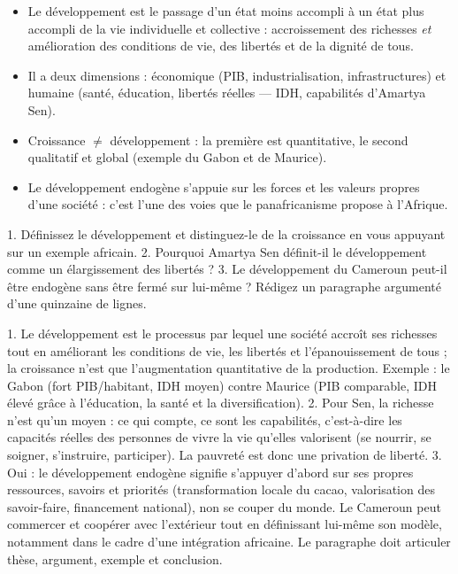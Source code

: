 \documentclass[11pt]{article}
\newcommand{\cle}[1]{{\popxbold\color{popdark}#1}}
\begin{document}
\begin{aretenir}
\begin{itemize}
\item Le \cle{développement} est le passage d'un état moins accompli à un état plus accompli de la vie individuelle et collective : accroissement des richesses \emph{et} amélioration des conditions de vie, des libertés et de la dignité de tous.
\item Il a deux dimensions : économique (PIB, industrialisation, infrastructures) et humaine (santé, éducation, libertés réelles — IDH, capabilités d'Amartya Sen).
\item \cle{Croissance} $\neq$ \cle{développement} : la première est quantitative, le second qualitatif et global (exemple du Gabon et de Maurice).
\item Le \cle{développement endogène} s'appuie sur les forces et les valeurs propres d'une société : c'est l'une des voies que le panafricanisme propose à l'Afrique.
\end{itemize}
\end{aretenir}

\begin{exercice}
1. Définissez le développement et distinguez-le de la croissance en vous appuyant sur un exemple africain. 2. Pourquoi Amartya Sen définit-il le développement comme un élargissement des libertés ? 3. Le développement du Cameroun peut-il être endogène sans être fermé sur lui-même ? Rédigez un paragraphe argumenté d'une quinzaine de lignes.
\end{exercice}

\begin{corrige}[Exercice 1]
1. Le développement est le processus par lequel une société accroît ses richesses tout en améliorant les conditions de vie, les libertés et l'épanouissement de tous ; la croissance n'est que l'augmentation quantitative de la production. Exemple : le Gabon (fort PIB/habitant, IDH moyen) contre Maurice (PIB comparable, IDH élevé grâce à l'éducation, la santé et la diversification). 2. Pour Sen, la richesse n'est qu'un moyen : ce qui compte, ce sont les capabilités, c'est-à-dire les capacités réelles des personnes de vivre la vie qu'elles valorisent (se nourrir, se soigner, s'instruire, participer). La pauvreté est donc une privation de liberté. 3. Oui : le développement endogène signifie s'appuyer d'abord sur ses propres ressources, savoirs et priorités (transformation locale du cacao, valorisation des savoir-faire, financement national), non se couper du monde. Le Cameroun peut commercer et coopérer avec l'extérieur tout en définissant lui-même son modèle, notamment dans le cadre d'une intégration africaine. Le paragraphe doit articuler thèse, argument, exemple et conclusion.
\end{corrige}
\end{document}
